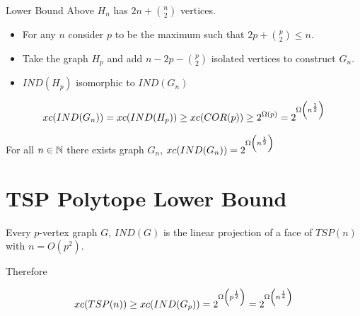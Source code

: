 \documentclass[aspectratio=1610, handout]{beamer}
\begin{document}
\begin{frame}{Lower Bound}
	Above $H_n$ has $2n+\binom{n}2$ vertices.\pause\vspace*{5mm}
	
	\begin{itemize}
		\item For any $n$ consider $p$ to be the maximum such that $2p+\binom{p}2\leq n$. \vspace*{5mm}\pause
		
		\item Take the graph $H_p$ and add $n-2p-\binom{p}2$ isolated vertices to construct $G_n$. \vspace*{5mm}\pause
		
		\item $IND(H_p)$ isomorphic to $IND(G_n)$
	\end{itemize}\pause

	$$xc(IND(G_n))=xc(IND(H_p))\geq xc(COR(p))\geq 2^{\Omega(p)}=2^{\Omega\left(n^{\frac12}\right)}$$
\begin{theorem}
	For all $n\in\mathbb{N}$ there exists graph $G_n$, $xc(IND(G_n))=2^{\Omega\left(n^{\frac12}\right)}$
\end{theorem}
\end{frame}
\section{TSP Polytope Lower Bound}
\begin{frame}
	\begin{theorem}
		Every $p$-vertex graph $G$, $IND(G)$ is the linear projection of a face of $TSP(n)$ with $n=O(p^2)$.
	\end{theorem}
\vspace*{5mm}\pause

	Therefore 
	
	$$xc(TSP(n))\geq xc(IND(G_p))=2^{\Omega\left(p^{\frac12}\right)}=2^{\Omega\left(n^{\frac14}\right)}$$
\end{frame}

\end{document}
